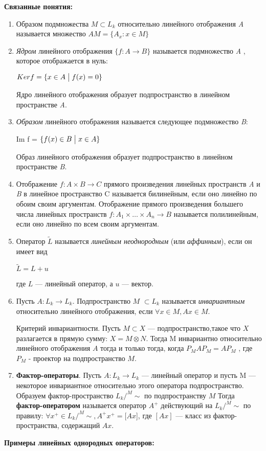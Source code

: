 \documentclass[12pt,a4paper]{article}
\author{Давиденко Алексей}
\begin{document}
{\large {\bf Связанные понятия:}}
\begin{enumerate}
\item Образом подмножества $  M  \subset  L_k$ относительно линейного отображения {\it A} называется множество $AM=\{A_x\colon x \in M\}$
\item \textit{Ядром}  линейного отображения $\{f\colon A \to B \}$ называется подмножество {\it A} , которое отображается в нуль: 

\medskip
$Ker f = \{x \in A \bigm | f(x)=0\}$ 


Ядро линейного отображения образует подпространство в линейном пространстве {\it A}.
\item \textit{Образом} линейного отображения  называется следующее подмножество {\it B}:

\medskip
Im f =  $\{f(x) \in B \bigm | x \in A\}$


Образ линейного отображения образует подпространство в линейном пространстве {\it B}.

\medskip
\item Отображение $f\colon A \times B \to C $ прямого произведения линейных пространств {\it A} и {\it B} в линейное пространство C называется билинейным, если оно линейно по обоим своим аргументам. Отображение прямого произведения большего числа линейных пространств $f\colon A_1 \times\dots\times A_n \to B$ называется полилинейным, если оно линейно по всем своим аргументам.
\item Оператор $\widetilde{L}$ называется \textit{линейным неоднородным} (или \textit{аффинным}), если он имеет вид

$\widetilde{L} = L+u$

где $L$ --- линейный оператор, а $u$ --- вектор.
\item Пусть $A\colon L_k \to L_k$. Подпространство $M$  $\subset  L_k$ называется \textit{инвариантным} относительно линейного отображения, если $\forall x \in M , Ax \in M$.

Критерий инвариантности. Пусть $ M \subset X$ --- подпространство,такое что $X$ разлагается в прямую сумму: $X= M \otimes N$. Тогда M инвариантно относительно линейного отображения $A$ тогда и только тогда, когда $P_M A P_M = AP_M$ , где $ P_M$ - проектор на подпространство $M$.
\item {\bf Фактор-операторы}. Пусть $A \colon L_k \to L_k$ --- линейный оператор и пусть M --- некоторое инвариантное относительно этого оператора подпространство. Образуем фактор-пространство $ L_k\bigl/^M\sim$ по подпространству $M$ Тогда {\bf фактор-оператором} называется оператор $A^+$ действующий на $ L_k\bigl/^M\sim$ по правилу: $\forall x^+ \in  L_k\bigl/^M\sim, A^+ x^+ = [Ax$], где $[Ax]$ --- класс из фактор-пространства, содержащий $Ax$.
\end{enumerate}
{\large {\bf Примеры линейных однородных операторов:}}
\end{document}
